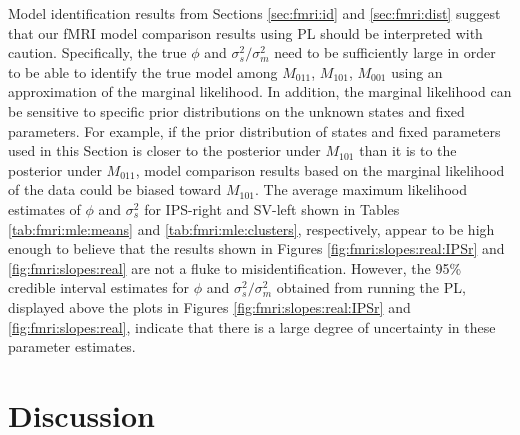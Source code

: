 
Model identification results from Sections \ref{sec:fmri:id} and \ref{sec:fmri:dist} suggest that our fMRI model comparison results using PL should be interpreted with caution. Specifically, the true $\phi$ and $\sigma^2_s / \sigma^2_m$ need to be sufficiently large in order to be able to identify the true model among $M_{011}$, $M_{101}$, $M_{001}$ using an approximation of the marginal likelihood. In addition, the marginal likelihood can be sensitive to specific prior distributions on the unknown states and fixed parameters. For example, if the prior distribution of states and fixed parameters used in this Section is closer to the posterior under $M_{101}$ than it is to the posterior under $M_{011}$, model comparison results based on the marginal likelihood of the data could be biased toward $M_{101}$. The average maximum likelihood estimates of $\phi$ and $\sigma^2_s$ for IPS-right and SV-left shown in Tables \ref{tab:fmri:mle:means} and \ref{tab:fmri:mle:clusters}, respectively, appear to be high enough to believe that the results shown in Figures \ref{fig:fmri:slopes:real:IPSr} and \ref{fig:fmri:slopes:real} are not a fluke to misidentification. However, the 95\% credible interval estimates for $\phi$ and $\sigma^2_s / \sigma^2_m$ obtained from running the PL, displayed above the plots in Figures \ref{fig:fmri:slopes:real:IPSr} and \ref{fig:fmri:slopes:real}, indicate that there is a large degree of uncertainty in these parameter estimates.

\section{Discussion \label{sec:fmri:discussion}}

